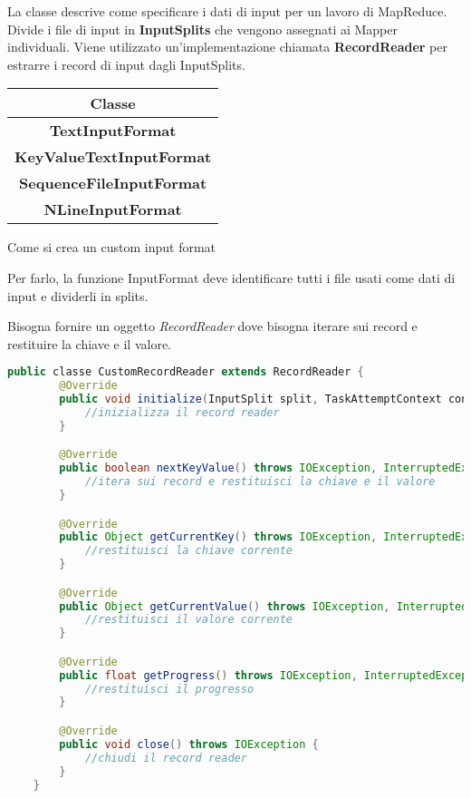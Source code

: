 La classe descrive come specificare i dati di input per un lavoro di MapReduce.
Divide i file di input in \textbf{InputSplits} che vengono assegnati ai Mapper
individuali. Viene utilizzato un'implementazione chiamata \textbf{RecordReader}
per estrarre i record di input dagli InputSplits.

\begin{table}[H]
    \begin{center}
        \begin{tabular}{|c|}
            \hline
            \textbf{Classe}                  \\
            \hline
            \textbf{TextInputFormat}         \\
            \hline
            \textbf{KeyValueTextInputFormat} \\
            \hline
            \textbf{SequenceFileInputFormat} \\
            \hline
            \textbf{NLineInputFormat}        \\
            \hline
        \end{tabular}
    \end{center}
\end{table}

\begin{domanda}
    Come si crea un custom input format
\end{domanda}

Per farlo, la funzione InputFormat deve identificare tutti i file usati come
dati di input e dividerli in splits.

Bisogna fornire un oggetto \textit{RecordReader} dove bisogna iterare sui
record e restituire la chiave e il valore.

\begin{lstlisting}[language=Java]
    public classe CustomRecordReader extends RecordReader {
        @Override
        public void initialize(InputSplit split, TaskAttemptContext context) throws IOException, InterruptedException {
            //inizializza il record reader
        }

        @Override
        public boolean nextKeyValue() throws IOException, InterruptedException {
            //itera sui record e restituisci la chiave e il valore
        }

        @Override
        public Object getCurrentKey() throws IOException, InterruptedException {
            //restituisci la chiave corrente
        }

        @Override
        public Object getCurrentValue() throws IOException, InterruptedException {
            //restituisci il valore corrente
        }

        @Override
        public float getProgress() throws IOException, InterruptedException {
            //restituisci il progresso
        }

        @Override
        public void close() throws IOException {
            //chiudi il record reader
        }
    }
\end{lstlisting}

